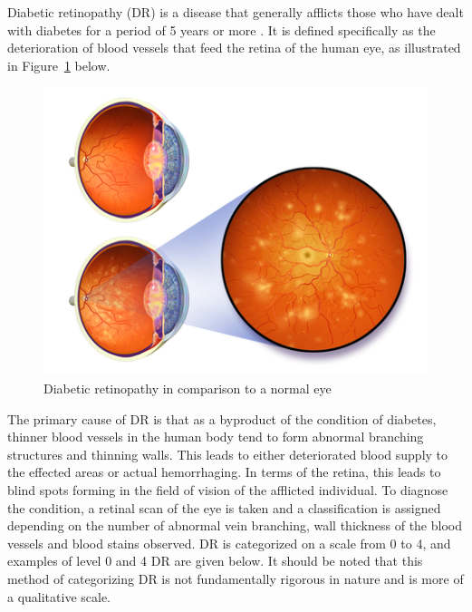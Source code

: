 \documentclass[letterpaper,12pt]{article}
\newcommand{\figref}[1]{Figure~\ref{#1}}
\begin{document}
Diabetic retinopathy (DR) is a disease that generally afflicts those who have dealt with diabetes for a period of 5 years or more \cite{nih}. It is defined specifically as the deterioration of blood vessels that feed the retina of the human eye, as illustrated in \figref{eye} below.
\begin{figure}[htbp]
\begin{center}
\includegraphics[scale=0.6]{images/illustration.png}
\caption{Diabetic retinopathy in comparison to a normal eye \cite{wiki}}
\label{eye}
\end{center}
\end{figure}
The primary cause of DR is that as a byproduct of the condition of diabetes, thinner blood vessels in the human body tend to form abnormal branching structures and thinning walls. This leads to either deteriorated blood supply to the effected areas or actual hemorrhaging. In terms of the retina, this leads to blind spots forming in the field of vision of the afflicted individual. 
To diagnose the condition, a retinal scan of the eye is taken and a classification is assigned depending on the number of abnormal vein branching, wall thickness of the blood vessels and blood stains observed. DR is categorized on a scale from 0 to 4, and examples of level 0 and 4 DR are given below. It should be noted that this method of categorizing DR is not fundamentally rigorous in nature and is more of a qualitative scale. 
\end{document}
